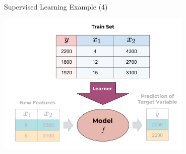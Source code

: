 \documentclass[11pt,compress,t,notes=noshow, xcolor=table]{beamer}
\begin{document}


\begin{vbframe}{Supervised Learning Example (4)}




  
  \begin{center}
    \includegraphics[width = 0.7\textwidth]{figure_man/the_inducer_web.png}
  \end{center}


\end{vbframe}
\end{document}
